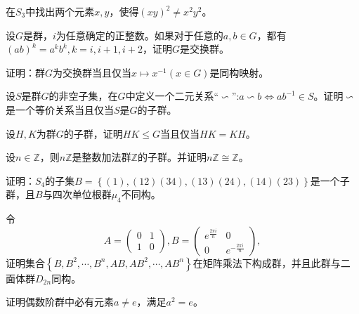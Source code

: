 \begin{prob}
在$S_{3}$中找出两个元素$x,y$，使得$\left(xy\right)^{2}\neq x^{2}y^{2}$。
\end{prob}

\begin{prob}
设$G$是群，$i$为任意确定的正整数。如果对于任意的$a,b\in G$，都有$\left(ab\right)^{k}=a^{k}b^{k},k=i,i+1,i+2$，证明$G$是交换群。
\end{prob}

\begin{prob}
证明：群$G$为交换群当且仅当$x\longmapsto x^{-1}(x\in G)$是同构映射。
\end{prob}

\begin{prob}
设$S$是群$G$的非空子集，在$G$中定义一个二元关系``$\backsim $'':$a\backsim b \Longleftrightarrow ab^{-1}\in S$。证明$\backsim $是一个等价关系当且仅当$S$是$G$的子群。
\end{prob}

\begin{prob}
设$H,K$为群$G$的子群，证明$HK\leqslant G$当且仅当$HK=KH$。
\end{prob}

\begin{prob}
设$n\in \mathbb{Z}$，则$n\mathbb{Z}$是整数加法群$\mathbb{Z}$的子群。并证明$n\mathbb{Z}\cong \mathbb{Z}$。
\end{prob}

\begin{prob}
证明：$S_{4}$的子集$B=\left\{\left(1\right),\left(12\right)\left(34\right),\left(13\right)\left(24\right),\left(14\right)\left(23\right) \right\}$是一个子群，且$B$与四次单位根群$\mu _{4}$不同构。
\end{prob}

\begin{prob}
令
\begin{equation*}
A=\begin{pmatrix}
0&1\\
1&0
\end{pmatrix},B=\begin{pmatrix}
e^{\frac{2\pi i}{n}}&0\\
0&e^{-\frac{2\pi i}{n}}
\end{pmatrix},
\end{equation*}
证明集合$\left\{B,B^{2},\cdots ,B^{n},AB,AB^{2},\cdots ,AB^{n} \right\}$在矩阵乘法下构成群，并且此群与二面体群$D_{2n}$同构。
\end{prob}

\begin{prob}
证明偶数阶群中必有元素$a\neq e$，满足$a^{2}=e$。
\end{prob}

